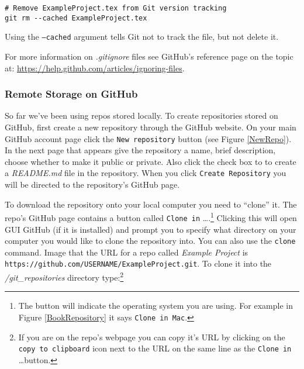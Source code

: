 \begin{knitrout}
\color{fgcolor}\begin{kframe}
\begin{verbatim}
# Remove ExampleProject.tex from Git version tracking
git rm --cached ExampleProject.tex
\end{verbatim}
\end{kframe}
\end{knitrout}


\noindent Using the \texttt{--cached} argument tells Git not to track the file, but not delete it. 

For more information on \emph{.gitignore} files see GitHub's reference page on the topic at: \url{https://help.github.com/articles/ignoring-files}.


\subsubsection{Remote Storage on GitHub}

So far we've been using repos stored locally. To create repositories stored on GitHub, first create a new repository through the GitHub website. On your main GitHub account page click the \texttt{New repository} button (see Figure \ref{NewRepo}). In the next page that appears give the repository a name, brief description, choose whether to make it public or private. Also click the check box to to create a \emph{README.md} file in the repository. When you click \texttt{Create Repository} you will be directed to the repository's GitHub page. 

To download the repository onto your local computer you need to ``clone'' it. The repo's GitHub page contains a button called \texttt{Clone in} \ldots.\footnote{The button will indicate the operating system you are using. For example in Figure \ref{BookRepository} it says \texttt{Clone in Mac}.} Clicking this will open GUI GitHub (if it is installed) and prompt you to specify what directory on your computer you would like to clone the repository into. You can also use the \texttt{clone} command. Image that the URL for a repo called \emph{Example Project} is \texttt{https://github.com/USERNAME/ExampleProject.git}. To clone it into the \emph{/git\_repositories} directory type:\footnote{If you are on the repo's webpage you can copy it's URL by clicking on the \texttt{copy to clipboard} icon next to the URL on the same line as the \texttt{Clone in} \ldots button.}

